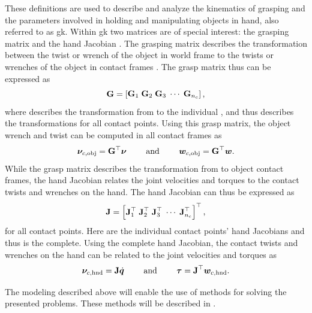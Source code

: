 These definitions are used to describe and analyze the kinematics of grasping and the parameters involved in holding and manipulating objects in hand, also referred to as \gls{gk}. Within \gls{gk} two matrices are of special interest: the grasping matrix  and the hand Jacobian . The grasping matrix describes the transformation between the twist or wrench of the object in world frame  to the twists or wrenches of the object in contact frames . The grasp matrix thus can be expressed as
%
\begin{equation}
	\mat{G} = \rvec{ \mat{G}_1 \vsep \mat{G}_2 \vsep \mat{G}_3 \vsep \cdots \vsep \mat{G}_{n_c}},
	\label{eq:grasp-matrix-def}
\end{equation}
%
where  describes the transformation from  to the individual , and thus  describes the transformations for all contact points. Using this grasp matrix, the object wrench and twist can be computed in all contact frames as
%
\begin{equation}
	\bm{\nu}_{c,\text{obj}} =  \bm{\mathrm{G}}^\top \bm{\nu} \qquad \text{ and } \qquad \bm{w}_{c,\text{obj}} =  \bm{\mathrm{G}}^\top \bm{w}.
	\label{eq:grasp-matrix-twist}
\end{equation}
%
While the grasp matrix describes the transformation from  to object contact frames, the hand Jacobian relates the joint velocities and torques to the contact twists and wrenches on the hand. The hand Jacobian can thus be expressed as 
%
\begin{equation}
	\mat{J} = \rvec{ \mat{J}_1^\T \vsep \mat{J}_2^\T \vsep \mat{J}_3^\T \vsep \cdots \vsep \mat{J}_{n_c}^\T}^\T,
	\label{eq:hand-jacobian-matrix}
\end{equation}
%
for all contact points. Here  are the individual contact points' hand Jacobians and thus  is the complete. Using the complete hand Jacobian, the contact twists and wrenches on the hand can be related to the joint velocities and torques as
% 
\begin{equation}
	\bm{\nu}_{c,\text{hnd}} = \bm{\mathrm{J}} \dot{\bm{q}} \qquad \text{ and } \qquad \bm{\tau} = \bm{\mathrm{J}}^\top \bm{w}_{c,\text{hnd}}.
	\label{eq:hand-jacobian-velocity}
\end{equation}

The modeling described above will enable the use of methods for solving the presented problems. These methods will be described in .
